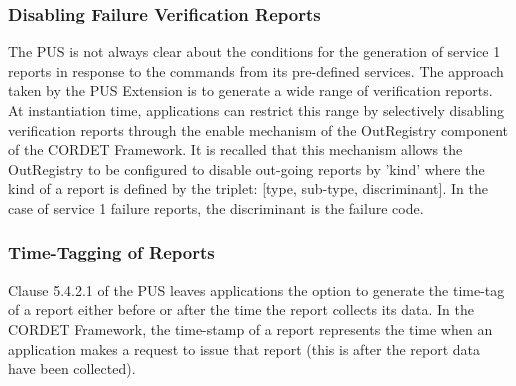 \documentclass{pnp_article}
\begin{document}
\subsubsection{Disabling Failure Verification Reports} 
The PUS is not always clear about the conditions for the generation of service 1 reports in response to the commands from its pre-defined services. The approach taken by the PUS Extension is to generate a wide range of verification reports. At instantiation time, applications can restrict this range by selectively disabling verification reports through the enable mechanism of the OutRegistry component of the CORDET Framework. It is recalled that this mechanism allows the OutRegistry to be configured to disable out-going reports by 'kind' where the kind of a report is defined by the triplet: [type, sub-type, discriminant]. In the case of service 1 failure reports, the discriminant is the failure code. 
 
\subsubsection{Time-Tagging of Reports}
Clause 5.4.2.1 of the PUS leaves applications the option to generate the time-tag of a report either before or after the time the report collects its data. In the CORDET Framework, the time-stamp of a report represents the time when an application makes a request to issue that report (this is after the report data have been collected). 
\end{document}
